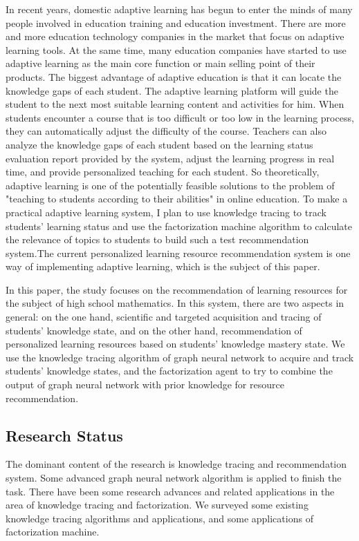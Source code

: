 \documentclass[11pt,en]{elegantpaper}
\begin{document}
In recent years, domestic adaptive learning has begun to enter the minds of many people involved in education training and education investment. There are more and more education technology companies in the market that focus on adaptive learning tools. At the same time, many education companies have started to use adaptive learning as the main core function or main selling point of their products. The biggest advantage of adaptive education is that it can locate the knowledge gaps of each student. The adaptive learning platform will guide the student to the next most suitable learning content and activities for him. When students encounter a course that is too difficult or too low in the learning process, they can automatically adjust the difficulty of the course. Teachers can also analyze the knowledge gaps of each student based on the learning status evaluation report provided by the system, adjust the learning progress in real time, and provide personalized teaching for each student. So theoretically, adaptive learning is one of the potentially feasible solutions to the problem of "teaching to students according to their abilities" in online education. To make a practical adaptive learning system, I plan to use knowledge tracing to track students' learning status and use the factorization machine algorithm to calculate the relevance of topics to students to build such a test recommendation system.The current personalized learning resource recommendation system is one way of implementing adaptive learning, which is the subject of this paper.

In this paper, the study focuses on the recommendation of learning resources for the subject of high school mathematics. In this system, there are two aspects in general: on the one hand, scientific and targeted acquisition and tracing of students' knowledge state, and on the other hand, recommendation of personalized learning resources based on students' knowledge mastery state. We use the knowledge tracing algorithm of graph neural network to acquire and track students' knowledge states, and the factorization agent to try to combine the output of graph neural network with prior knowledge for resource recommendation.


\subsection{Research Status}
The dominant content of the research is knowledge tracing and recommendation system. Some advanced graph neural network algorithm is applied to finish the task. There have been some research advances and related applications in the area of knowledge tracing and factorization. We surveyed some existing knowledge tracing algorithms and applications, and some applications of factorization machine.
\end{document}
